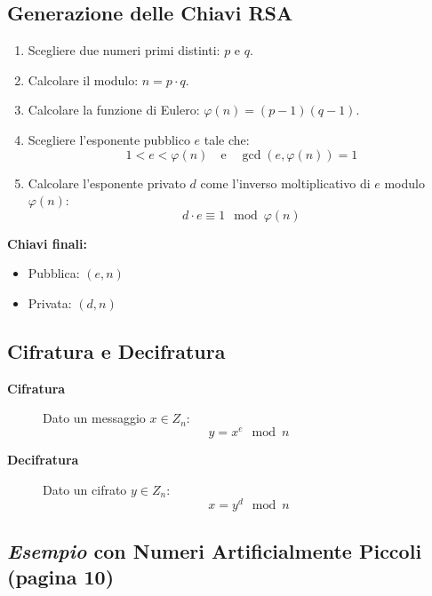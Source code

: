 \documentclass{report}
\begin{document}
\subsection{Generazione delle Chiavi RSA}
\begin{enumerate}
  \item Scegliere due numeri primi distinti: $p$ e $q$.
  \item Calcolare il modulo: $n = p \cdot q$.
  \item Calcolare la funzione di Eulero: $\varphi(n) = (p - 1)(q - 1)$.
  \item Scegliere l'esponente pubblico $e$ tale che:
  \begin{equation}
  1 < e < \varphi(n) \quad \text{e} \quad \gcd(e, \varphi(n)) = 1
  \end{equation}
  \item Calcolare l'esponente privato $d$ come l'inverso moltiplicativo di $e$ modulo $\varphi(n)$:
  \begin{equation}
  d \cdot e \equiv 1 \mod \varphi(n)
  \end{equation}
\end{enumerate}

\textbf{Chiavi finali:} 
\begin{itemize}
  \item Pubblica: $(e, n)$
  \item Privata: $(d, n)$
\end{itemize}

\subsection{Cifratura e Decifratura}
\begin{description}
  \item[\textbf{Cifratura}] Dato un messaggio $x \in Z_{n}$:
  \begin{equation}
  y = x^e \mod n
  \end{equation}
  \item[\textbf{Decifratura}] Dato un cifrato $y \in Z_{n}$:
  \begin{equation}
  x = y^d \mod n
  \end{equation}
\end{description}

\subsection{\textit{Esempio} con Numeri Artificialmente Piccoli (pagina 10)}
\end{document}
